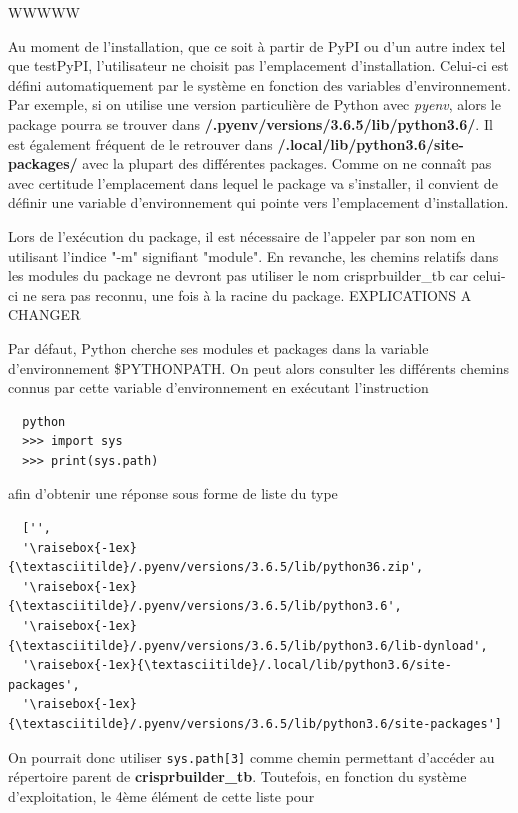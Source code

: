 \documentclass[twoside,a4paper,11pt,frenchb,openany]{report}
\begin{document}
WWWWW

Au moment de l'installation, que ce soit à partir de PyPI ou d'un autre index tel que
testPyPI, l'utilisateur ne choisit pas l'emplacement d'installation. Celui-ci est défini automatiquement par le système en fonction des variables d'environnement. Par exemple, si on utilise une version particulière de Python avec \textit{pyenv}, alors le package pourra se trouver dans \textbf{\raisebox{-1ex}{\textasciitilde}/.pyenv/versions/3.6.5/lib/python3.6/}. Il est également fréquent de le retrouver dans \textbf{\raisebox{-1ex}{\textasciitilde}/.local/lib/python3.6/site-packages/} avec la plupart des différentes packages. Comme on ne connaît pas avec certitude l'emplacement dans lequel le package va s'installer, il convient de définir une variable d'environnement qui pointe vers l'emplacement d'installation.

Lors de l'exécution du package, il est nécessaire de l'appeler par son nom en utilisant l'indice "-m" signifiant "module".  En revanche, les chemins relatifs dans les modules du package ne devront pas utiliser le nom crisprbuilder\_tb car celui-ci ne sera pas reconnu, une fois à la racine du package. EXPLICATIONS A CHANGER

Par défaut, Python cherche ses modules et packages dans la variable d'environnement \$PYTHONPATH. On peut alors consulter les différents chemins connus par cette variable d'environnement en exécutant l'instruction
\begin{verbatim}  python
  >>> import sys
  >>> print(sys.path)\end{verbatim}

afin d'obtenir une réponse sous forme de liste du type
\begin{verbatim}  ['',
  '\raisebox{-1ex}{\textasciitilde}/.pyenv/versions/3.6.5/lib/python36.zip',
  '\raisebox{-1ex}{\textasciitilde}/.pyenv/versions/3.6.5/lib/python3.6',
  '\raisebox{-1ex}{\textasciitilde}/.pyenv/versions/3.6.5/lib/python3.6/lib-dynload',    
  '\raisebox{-1ex}{\textasciitilde}/.local/lib/python3.6/site-packages',
  '\raisebox{-1ex}{\textasciitilde}/.pyenv/versions/3.6.5/lib/python3.6/site-packages']\end{verbatim}

On pourrait donc utiliser \texttt{sys.path[3]} comme chemin permettant d'accéder au répertoire parent de \textbf{crisprbuilder\_tb}. Toutefois, en fonction du système d'exploitation,  le 4ème élément de cette liste pour
\end{document}
